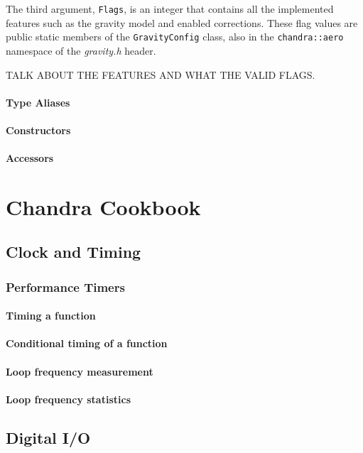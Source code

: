 \documentclass[10pt,letterpaper]{memoir} %
\begin{document}
The third argument, \texttt{Flags}, is an integer that contains all the implemented features such as the gravity model and enabled corrections.  These flag values are public static members of the \texttt{GravityConfig} class, also in the \texttt{chandra::aero} namespace of the \emph{gravity.h} header.   

TALK ABOUT THE FEATURES AND WHAT THE VALID FLAGS.

\subsection{Type Aliases}

\subsection{Constructors}

\subsection{Accessors}



\part{Chandra Cookbook}
\chapter{Clock and Timing}
\section{Performance Timers}
\subsection{Timing a function}
\subsection{Conditional timing of a function}
\subsection{Loop frequency measurement}
\subsection{Loop frequency statistics}

\chapter{Digital I/O}
\end{document}
